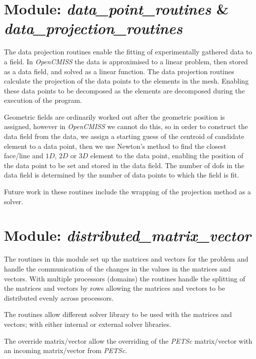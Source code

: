 \section{Module: \emph{data\_point\_routines} \&  \\ 
\emph{data\_projection\_routines}}
\label{sec:dataprojectionroutines}

The data projection routines enable the fitting of experimentally gathered 
data to a field. In \emph{OpenCMISS} the data is approximised to a linear 
problem, then stored as a data field, and solved as a linear function. The 
data projection routines calculate the projection of the data points to the 
elements in the mesh. Enabling these data points to be decomposed as the 
elements are decomposed during the execution of the program. 

Geometric fields are ordinarily worked out after the geometric position is 
assigned, however in \emph{OpenCMISS} we cannot do this, so in order to 
construct the data field from the data, we assign a starting guess of the 
centroid of candidate element to a data point, then we use Newton's method 
to find the closest face/line and $1D$, $2D$ or $3D$ element to the data point, 
enabling the position of the data point to be set and stored in the data field. 
The number of dofs in the data field is determined by the number of data points 
to which the field is fit.

Future work in these routines include the wrapping of the projection method
as a solver.


\section{Module: \emph{distributed\_matrix\_vector}}
\label{sec:distributedmatrixvector}

The routines in this module set up the matrices and vectors for the problem 
and handle the communication of the changes in the values in the matrices and 
vectors. With multiple processors (domains) the routines handle the splitting 
of the matrices and vectors by rows allowing the matrices and vectors to be
distributed evenly across processors. 

The routines allow different solver library to be used with the matrices and 
vectors; with either internal or external solver libraries.

The override matrix/vector allow the overriding of the \emph{PETSc} matrix/vector 
with an incoming matrix/vector from \emph{PETSc}.

